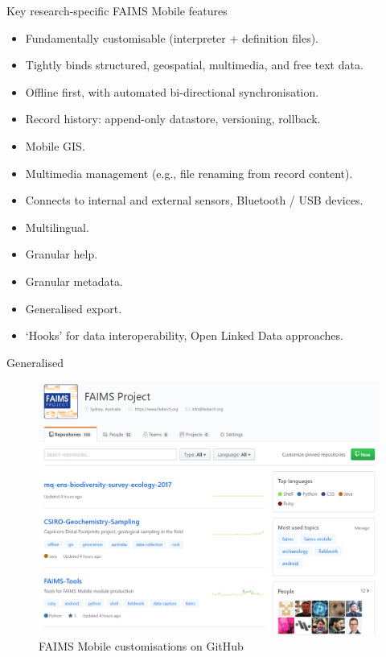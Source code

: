 \documentclass[aspectratio=169, 11pt]{beamer} %
\begin{document}
\begin{frame}{Key research-specific FAIMS Mobile features}
    \begin{itemize}[label=\textbullet]
        \item Fundamentally customisable (interpreter + definition files).
        \item Tightly binds structured, geospatial, multimedia, and free text data.
        \item Offline first, with automated bi-directional synchronisation.
        \item Record history: append-only datastore, versioning, rollback.
        \item Mobile GIS.
        \item Multimedia management (e.g., file renaming from record content).
        \item Connects to internal and external sensors, Bluetooth / USB devices.
        \item Multilingual.
        \item Granular help.
        \item Granular metadata.
        \item Generalised export.
        \item `Hooks’ for data interoperability, Open Linked Data approaches.
    \end{itemize}
\end{frame}

\begin{frame}{Generalised}
 \begin{figure}[H]
    \centering
        \includegraphics[height=.75\textheight]{figures/FAIMS-generalised.png}
        \caption{FAIMS Mobile customisations on GitHub}
        \label{fig:FAIMS-github}
 \end{figure}
\end{frame}
\end{document}
